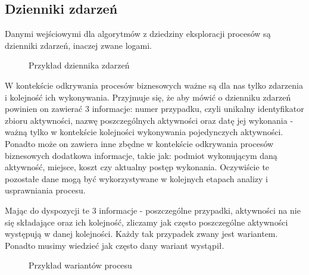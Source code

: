 \subsection{Dzienniki zdarzeń}
\label{sec:event_logs}
Danymi wejściowymi dla algorytmów z dziedziny eksploracji procesów są dzienniki zdarzeń, inaczej zwane logami.
 
\begin{figure}[h]
	\caption{\label{fig:event_log_example}Przykład dziennika zdarzeń}
\end{figure}

W kontekście odkrywania procesów biznesowych ważne są dla nas tylko zdarzenia i kolejność ich wykonywania.
Przyjmuje się, że aby mówić o dzienniku zdarzeń powinien on zawierać 3 informacje: numer przypadku, czyli unikalny identyfikator zbioru aktywności, nazwę poszczególnych aktywności oraz datę jej wykonania - ważną tylko w kontekście kolejności wykonywania pojedynczych aktywności. Ponadto może on zawiera inne zbędne w kontekście odkrywania procesów biznesowych dodatkowa informacje, takie jak: podmiot wykonującym daną aktywność, miejsce, koszt czy aktualny postęp wykonania. Oczywiście te pozostałe dane mogą być wykorzystywane w kolejnych etapach analizy i usprawniania procesu.

Mając do dyspozycji te 3 informacje - poszczególne przypadki, aktywności na nie się składające oraz ich kolejność, zliczamy jak często poszczególne aktywności występują w danej kolejności. Każdy tak przypadek zwany jest wariantem. Ponadto musimy wiedzieć jak często dany wariant wystąpił.

\begin{figure}[h]
	\caption{\label{fig:process_variants_example}Przykład wariantów procesu}
\end{figure}

